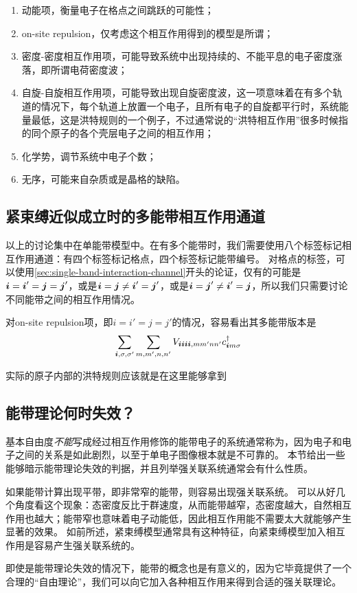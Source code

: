 \begin{enumerate}
    \item 动能项，衡量电子在格点之间跳跃的可能性；
    \item on-site repulsion，仅考虑这个相互作用得到的模型是所谓；
    \item 密度-密度相互作用项，可能导致系统中出现持续的、不能平息的电子密度涨落，即所谓电荷密度波；
    \item 自旋-自旋相互作用项，可能导致出现自旋密度波，这一项意味着在有多个轨道的情况下，每个轨道上放置一个电子，且所有电子的自旋都平行时，系统能量最低，这是洪特规则的一个例子，不过通常说的“洪特相互作用”很多时候指的同个原子的各个壳层电子之间的相互作用；
    \item 化学势，调节系统中电子个数；
    \item 无序，可能来自杂质或是晶格的缺陷。
\end{enumerate}

\subsection{紧束缚近似成立时的多能带相互作用通道}

以上的讨论集中在单能带模型中。在有多个能带时，我们需要使用八个标签标记相互作用通道：有四个标签标记格点，四个标签标记能带编号。
对格点的标签，可以使用\autoref{sec:single-band-interaction-channel}开头的论证，仅有的可能是$\vb*{i}=\vb*{i}'=\vb*{j}=\vb*{j}'$，或是$\vb*{i}=\vb*{j} \neq \vb*{i}'=\vb*{j}'$，或是$\vb*{i}=\vb*{j}' \neq \vb*{i}' = \vb*{j}$，所以我们只需要讨论不同能带之间的相互作用情况。

对on-site repulsion项，即$i=i'=j=j'$的情况，容易看出其多能带版本是
\[
    \sum_{\vb*{i}, \sigma, \sigma'} \sum_{m, m', n, n'} V_{\vb*{i} \vb*{i} \vb*{i} \vb*{i},mm' nn'} c^\dagger_{\vb*{i} m \sigma} 
\]

实际的原子内部的洪特规则应该就是在这里能够拿到

\subsection{能带理论何时失效？}

基本自由度\emph{不能}写成经过相互作用修饰的能带电子的系统通常称为，因为电子和电子之间的关系是如此剧烈，以至于单电子图像根本就是不可靠的。
本节给出一些能够暗示能带理论失效的判据，并且列举强关联系统通常会有什么性质。

如果能带计算出现平带，即非常窄的能带，则容易出现强关联系统。
可以从好几个角度看这个现象：态密度反比于群速度，从而能带越窄，态密度越大，自然相互作用也越大；能带窄也意味着电子动能低，因此相互作用能不需要太大就能够产生显著的效果。
如前所述，紧束缚模型通常具有这种特征，向紧束缚模型加入相互作用是容易产生强关联系统的。

即使是能带理论失效的情况下，能带的概念也是有意义的，因为它毕竟提供了一个合理的“自由理论”，我们可以向它加入各种相互作用来得到合适的强关联理论。
